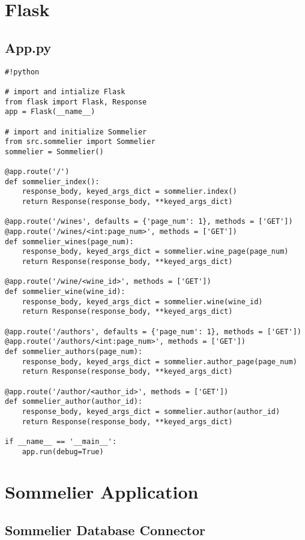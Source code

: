 \section{Flask}

\subsection{App.py} \label{app:flaskapp}

\begin{verbatim}
#!python

# import and intialize Flask
from flask import Flask, Response
app = Flask(__name__)

# import and initialize Sommelier
from src.sommelier import Sommelier
sommelier = Sommelier()

@app.route('/')
def sommelier_index():
    response_body, keyed_args_dict = sommelier.index()
    return Response(response_body, **keyed_args_dict)

@app.route('/wines', defaults = {'page_num': 1}, methods = ['GET'])
@app.route('/wines/<int:page_num>', methods = ['GET'])
def sommelier_wines(page_num):
    response_body, keyed_args_dict = sommelier.wine_page(page_num)
    return Response(response_body, **keyed_args_dict)

@app.route('/wine/<wine_id>', methods = ['GET'])
def sommelier_wine(wine_id):
    response_body, keyed_args_dict = sommelier.wine(wine_id)
    return Response(response_body, **keyed_args_dict)

@app.route('/authors', defaults = {'page_num': 1}, methods = ['GET'])
@app.route('/authors/<int:page_num>', methods = ['GET'])
def sommelier_authors(page_num):
    response_body, keyed_args_dict = sommelier.author_page(page_num)
    return Response(response_body, **keyed_args_dict)

@app.route('/author/<author_id>', methods = ['GET'])
def sommelier_author(author_id):
    response_body, keyed_args_dict = sommelier.author(author_id)
    return Response(response_body, **keyed_args_dict)

if __name__ == '__main__':
    app.run(debug=True)
\end{verbatim}

\section{Sommelier Application}

\subsection{Sommelier Database Connector}

